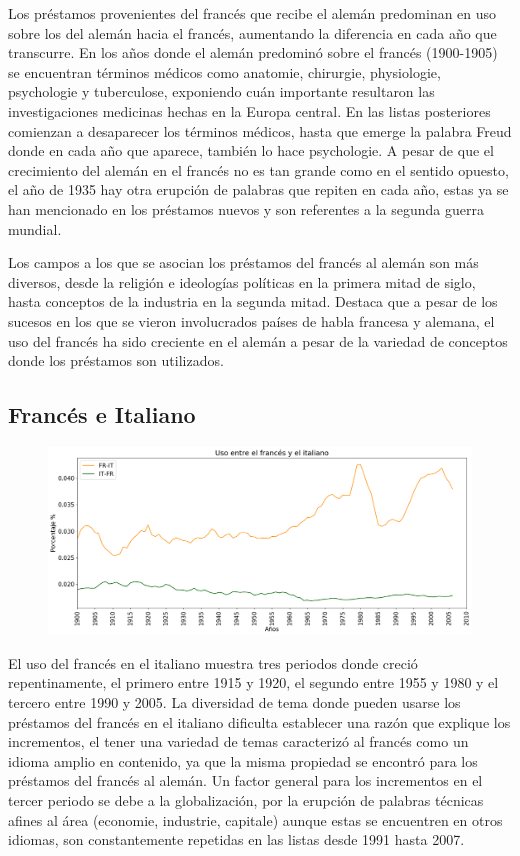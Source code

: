 Los préstamos provenientes del francés que recibe el alemán predominan en uso sobre los del alemán hacia el francés, aumentando la diferencia en cada año que transcurre.  En los años donde el alemán predominó sobre el francés (1900-1905) se encuentran términos médicos como anatomie, chirurgie, physiologie, psychologie y tuberculose, exponiendo cuán importante resultaron las investigaciones medicinas hechas en la Europa central.  En las listas posteriores comienzan a desaparecer los términos médicos, hasta que emerge la palabra Freud donde en cada año que aparece, también lo hace psychologie.  A pesar de que el crecimiento del alemán en el francés no es tan grande como en el sentido opuesto,  el año de 1935  hay otra erupción de palabras que repiten en cada año, estas ya se han mencionado en los préstamos nuevos y son referentes a la segunda guerra mundial. 

Los campos a los que se asocian los préstamos del francés al alemán son más diversos, desde la religión e ideologías políticas  en la primera mitad de siglo, hasta conceptos de la industria en la segunda mitad. Destaca que a pesar de los sucesos en los que se vieron involucrados países de habla francesa y alemana, el uso del francés ha sido creciente en el alemán  a pesar de la variedad de conceptos donde los préstamos son utilizados. 


\subsection{Francés e Italiano}

\begin{figure}[h!]
	\centering
	\includegraphics[scale=.38]{Cap_4/SF_3_S2_FR.png}
	\label{SF_FI}
	\caption{}
\end{figure}


El uso del francés en el italiano muestra tres periodos donde creció repentinamente, el primero entre 1915 y 1920, el segundo entre 1955 y 1980 y el tercero  entre 1990 y 2005.  La diversidad de tema donde pueden usarse los préstamos del francés en el italiano dificulta establecer una razón que explique los incrementos, el tener una variedad de temas caracterizó al francés como un idioma amplio  en contenido,  ya que la misma propiedad se encontró para los préstamos del francés al alemán.  Un factor general para los incrementos en el tercer periodo se debe a la globalización,  por la erupción de palabras  técnicas afines al área (economie, industrie,  capitale) aunque estas se encuentren en otros idiomas, son constantemente repetidas en las listas desde 1991 hasta 2007. 

